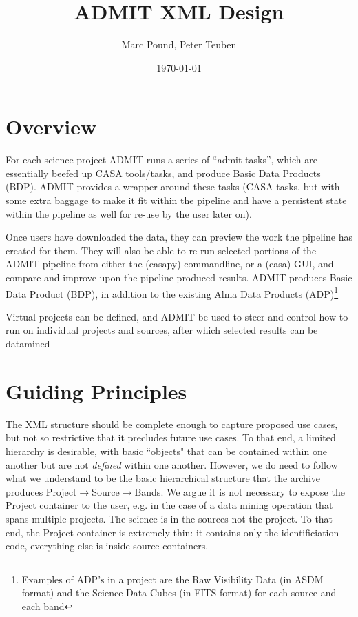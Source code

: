 \documentclass{report}
\title{ADMIT XML Design}
\author{Marc Pound, Peter Teuben}
\date{\today}
\begin{document}
\maketitle

\section{Overview}

For each science project ADMIT runs a series of ``admit tasks'', which
are essentially beefed up CASA tools/tasks, and produce Basic Data
Products (BDP).  ADMIT provides a wrapper around these tasks
(CASA tasks, but with some extra baggage to make it fit within the pipeline
and have a persistent state within the pipeline as well for re-use by
the user later on).

Once users have downloaded the data, they can preview the work the pipeline
has created for them. They will also be able to re-run
selected portions of the ADMIT pipeline from either the (casapy)
commandline, or a (casa) GUI, and compare and improve upon the
pipeline produced results. ADMIT produces Basic Data Product (BDP), in
addition to the existing Alma Data Products (ADP)\footnote{Examples of
ADP's in a project are the Raw Visibility Data (in ASDM format) and
the Science Data Cubes (in FITS format) for each source and each
band}

Virtual projects can be defined, and ADMIT be used to steer and control
how to run on individual projects and sources, after which selected
results can be datamined 

\section{Guiding Principles}
The XML structure should be complete enough to capture proposed use cases,
but not so restrictive that it precludes future use cases. To that end, a
limited hierarchy is desirable, with basic ``objects" that can be contained
within one another but are not {\it defined} within one another.  However, we
do need to follow what we understand to be the basic hierarchical structure
that the archive produces Project$\rightarrow$Source$\rightarrow$Bands.
We argue it is not necessary to expose the Project container to
the user, e.g. in the case of a data mining operation that spans multiple
projects. The science is in the sources not the project. To that end, the
Project container is extremely thin: it contains only the identificiation
code, everything else is inside source containers.
\end{document}
